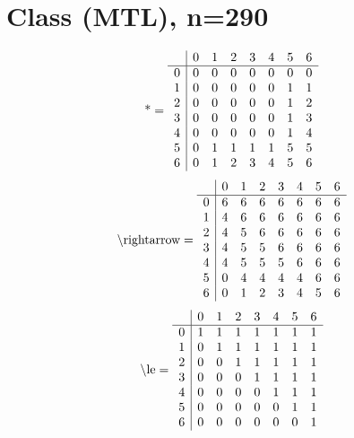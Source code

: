 \documentclass[11pt]{article}
\begin{document}
\section{Class (MTL), n=290}
\[\text{*} = 
\begin{array}{r | r r r r r r r}
 & 0 & 1 & 2 & 3 & 4 & 5 & 6 \\ \hline
0 & 0 & 0 & 0 & 0 & 0 & 0 & 0 \\
1 & 0 & 0 & 0 & 0 & 0 & 1 & 1 \\
2 & 0 & 0 & 0 & 0 & 0 & 1 & 2 \\
3 & 0 & 0 & 0 & 0 & 0 & 1 & 3 \\
4 & 0 & 0 & 0 & 0 & 0 & 1 & 4 \\
5 & 0 & 1 & 1 & 1 & 1 & 5 & 5 \\
6 & 0 & 1 & 2 & 3 & 4 & 5 & 6 \\
\end{array}
\]
\[\text{\textbackslash rightarrow} = 
\begin{array}{r | r r r r r r r}
 & 0 & 1 & 2 & 3 & 4 & 5 & 6 \\ \hline
0 & 6 & 6 & 6 & 6 & 6 & 6 & 6 \\
1 & 4 & 6 & 6 & 6 & 6 & 6 & 6 \\
2 & 4 & 5 & 6 & 6 & 6 & 6 & 6 \\
3 & 4 & 5 & 5 & 6 & 6 & 6 & 6 \\
4 & 4 & 5 & 5 & 5 & 6 & 6 & 6 \\
5 & 0 & 4 & 4 & 4 & 4 & 6 & 6 \\
6 & 0 & 1 & 2 & 3 & 4 & 5 & 6 \\
\end{array}
\]
\[\text{\textbackslash le} = 
\begin{array}{r | r r r r r r r}
 & 0 & 1 & 2 & 3 & 4 & 5 & 6 \\ \hline
0 & 1 & 1 & 1 & 1 & 1 & 1 & 1 \\
1 & 0 & 1 & 1 & 1 & 1 & 1 & 1 \\
2 & 0 & 0 & 1 & 1 & 1 & 1 & 1 \\
3 & 0 & 0 & 0 & 1 & 1 & 1 & 1 \\
4 & 0 & 0 & 0 & 0 & 1 & 1 & 1 \\
5 & 0 & 0 & 0 & 0 & 0 & 1 & 1 \\
6 & 0 & 0 & 0 & 0 & 0 & 0 & 1 \\
\end{array}
\]
\end{document}
